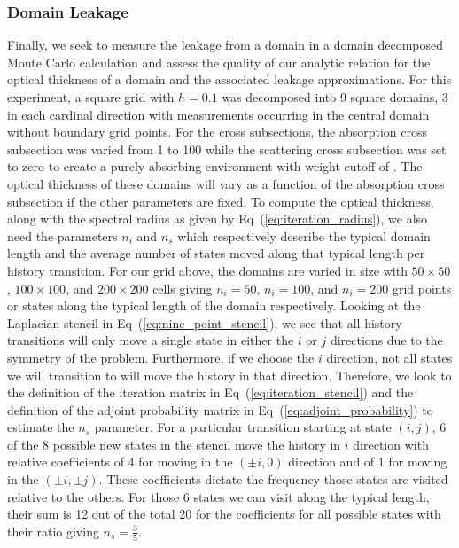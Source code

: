 \subsubsection{Domain Leakage}
\label{subsubsec:domain_leakage}
Finally, we seek to measure the leakage from a domain in a domain
decomposed Monte Carlo calculation and assess the quality of our
analytic relation for the optical thickness of a domain and the
associated leakage approximations. For this experiment, a square grid
with $h=0.1$ was decomposed into 9 square domains, 3 in each cardinal
direction with measurements occurring in the central domain without
boundary grid points. For the cross subsections, the absorption cross
subsection was varied from 1 to 100 while the scattering cross
subsection was set to zero to create a purely absorbing environment
with weight cutoff of . The optical thickness of these
domains will vary as a function of the absorption cross subsection if
the other parameters are fixed. To compute the optical thickness,
along with the spectral radius as given by
Eq~(\ref{eq:iteration_radius}), we also need the parameters $n_i$ and
$n_s$ which respectively describe the typical domain length and the
average number of states moved along that typical length per history
transition. For our grid above, the domains are varied in size with
$50 \times 50$, $100 \times 100$, and $200 \times 200$ cells giving
$n_i=50$, $n_i=100$, and $n_i=200$ grid points or states along the
typical length of the domain respectively. Looking at the Laplacian
stencil in Eq~(\ref{eq:nine_point_stencil}), we see that all history
transitions will only move a single state in either the $i$ or $j$
directions due to the symmetry of the problem. Furthermore, if we
choose the $i$ direction, not all states we will transition to will
move the history in that direction. Therefore, we look to the
definition of the iteration matrix in Eq~(\ref{eq:iteration_stencil})
and the definition of the adjoint probability matrix in
Eq~(\ref{eq:adjoint_probability}) to estimate the $n_s$ parameter. For
a particular transition starting at state $(i,j)$, 6 of the 8 possible
new states in the stencil move the history in $i$ direction with
relative coefficients of 4 for moving in the $(\pm i,0)$ direction and
of 1 for moving in the $(\pm i,\pm j)$. These coefficients dictate the
frequency those states are visited relative to the others. For those 6
states we can visit along the typical length, their sum is 12 out of
the total 20 for the coefficients for all possible states with their
ratio giving $n_s = \frac{3}{5}$.

